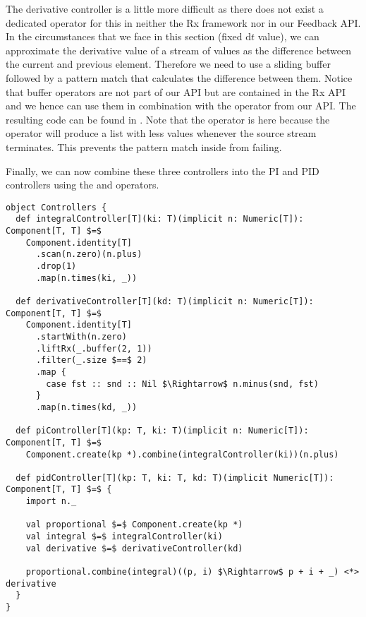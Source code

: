 The derivative controller is a little more difficult as there does not exist a dedicated operator for this in neither the Rx framework nor in our Feedback API. In the circumstances that we face in this section (fixed $\mathrm{d} t$ value), we can approximate the derivative value of a stream of values as the difference between the current and previous element. Therefore we need to use a sliding buffer followed by a pattern match that calculates the difference between them. Notice that buffer operators are not part of our API but are contained in the Rx API and we hence can use them in combination with the  operator from our API. The resulting code can be found in . Note that the  operator is here because the  operator will produce a list with less values whenever the source stream terminates. This prevents the pattern match inside  from failing.

Finally, we can now combine these three controllers into the PI and PID controllers using the  and \code{<*>} operators.

\begin{minipage}{\linewidth}
\begin{lstlisting}[style=ScalaStyle, caption={Implementation of the various commonly used controllers}, label={lst:controller-implementations}]
object Controllers {
  def integralController[T](ki: T)(implicit n: Numeric[T]): Component[T, T] $=$
    Component.identity[T]
      .scan(n.zero)(n.plus)
      .drop(1)
      .map(n.times(ki, _))

  def derivativeController[T](kd: T)(implicit n: Numeric[T]): Component[T, T] $=$
    Component.identity[T]
      .startWith(n.zero)
      .liftRx(_.buffer(2, 1))
      .filter(_.size $==$ 2)
      .map {
        case fst :: snd :: Nil $\Rightarrow$ n.minus(snd, fst)
      }
      .map(n.times(kd, _))
  
  def piController[T](kp: T, ki: T)(implicit n: Numeric[T]): Component[T, T] $=$
    Component.create(kp *).combine(integralController(ki))(n.plus)
  
  def pidController[T](kp: T, ki: T, kd: T)(implicit Numeric[T]): Component[T, T] $=$ {
    import n._
    
    val proportional $=$ Component.create(kp *)
    val integral $=$ integralController(ki)
    val derivative $=$ derivativeController(kd)
    
    proportional.combine(integral)((p, i) $\Rightarrow$ p + i + _) <*> derivative
  }
}
\end{lstlisting}
\end{minipage}

